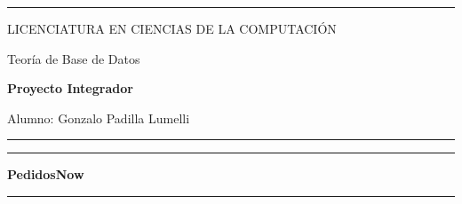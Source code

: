\documentclass[11pt]{article}
\begin{document}

\vspace{2cm}

\begin{singlespace}
\begin{center}
\rule{1\columnwidth}{2pt}
\par\end{center}

\begin{center}
{\Large{}LICENCIATURA EN CIENCIAS DE LA COMPUTACIÓN}{\Large\par}
\par\end{center}

\begin{center}
{\Large{}Teoría de Base de Datos}{\Large\par}
\par\end{center}

\begin{center}
\textbf{\large Proyecto Integrador}   \end{center}

\begin{center}
Alumno: Gonzalo Padilla Lumelli
\par\end{center}

\begin{center}
\rule{1\columnwidth}{2pt}    
\end{center}

\vspace{10em}

\begin{center}
\rule{1\columnwidth}{4pt}    
\end{center}

\begin{center}
\Large \textbf{PedidosNow}
\par\end{center}

\begin{center}
\rule{1\columnwidth}{4pt}    
\end{center}

\end{singlespace}
\end{document}
